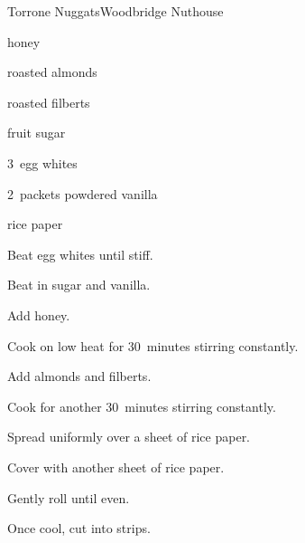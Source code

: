 \begin{recipe}{Torrone Nuggats}{Woodbridge Nuthouse}{}

\begin{ingredients}
\item {} honey
\item {} roasted almonds
\item {} roasted filberts
\item {} fruit sugar
\item 3~egg whites
\item 2~packets powdered vanilla
\item rice paper
\end{ingredients}

\begin{directions}
\item Beat egg whites until stiff.
\item Beat in sugar and vanilla.
\item Add honey.
\item Cook on low heat for 30~minutes stirring constantly.
\item Add almonds and filberts.
\item Cook for another 30~minutes stirring constantly.
\item Spread uniformly over a sheet of rice paper.
\item Cover with another sheet of rice paper.
\item Gently roll until even.
\item Once cool, cut into strips.
\end{directions}

\end{recipe}
